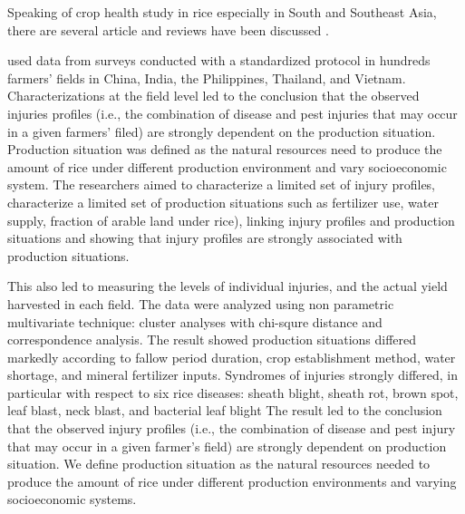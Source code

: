 Speaking of crop health study in rice especially in South and Southeast Asia, there are several article and reviews have been discussed \cite{savary2005multiple, Savary:2006to, Savary:2000vr, reddy2011characterizing, dong2010characterization}. 

\cite{Savary:2000vr} used data from surveys conducted with a standardized protocol in hundreds farmers’ fields in China, India, the Philippines, Thailand, and Vietnam. Characterizations at the field level led to the conclusion that the observed injuries profiles (i.e., the combination of disease and pest injuries that may occur in a given farmers’ filed) are strongly dependent on the production situation. Production situation was defined as the natural resources need to produce the amount of rice under different production environment and vary socioeconomic system. The researchers aimed to characterize a limited set of injury profiles, characterize a limited set of production situations such as fertilizer use, water supply, fraction of arable land under rice), linking injury profiles and production situations and showing that injury profiles are strongly associated with production situations. 

This also led to measuring the levels of individual injuries, and the actual yield harvested in each field. The data were analyzed using non parametric multivariate technique: cluster analyses with chi-squre distance and correspondence analysis. The result showed production situations differed markedly according to fallow period duration, crop establishment method, water shortage, and mineral fertilizer inputs. Syndromes of injuries strongly differed, in particular with respect to six rice diseases: sheath blight, sheath rot, brown spot, leaf blast, neck blast, and bacterial leaf blight The result led to the conclusion that the observed injury profiles (i.e., the combination of disease and pest injury that may occur in a given farmer’s field) are strongly dependent on production situation. We define production situation as the natural resources needed to produce the amount of rice under different production environments and varying socioeconomic systems.


